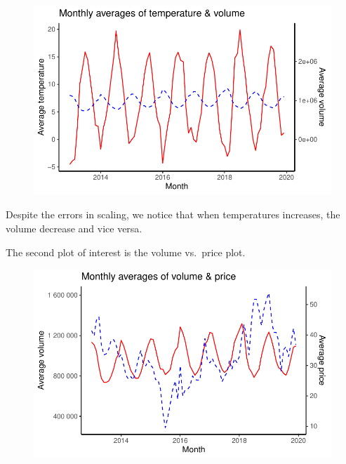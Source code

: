\documentclass[
  letterpaper,
  DIV=11,
  numbers=noendperiod]{scrartcl}
\newenvironment{Shaded}{\begin{snugshade}}{\end{snugshade}}
\newcommand{\NormalTok}[1]{\textcolor[rgb]{0.00,0.23,0.31}{#1}}
\newcommand{\SpecialCharTok}[1]{\textcolor[rgb]{0.37,0.37,0.37}{#1}}
\begin{document}
\begin{figure}[H]

{\centering \includegraphics{Assignment2_files/figure-pdf/unnamed-chunk-11-1.pdf}

}

\end{figure}

Despite the errors in scaling, we notice that when temperatures
increases, the volume decrease and vice versa.

The second plot of interest is the volume vs.~price plot.

\begin{Shaded}
\end{Shaded}

\begin{figure}[H]

{\centering \includegraphics{Assignment2_files/figure-pdf/unnamed-chunk-12-1.pdf}

}

\end{figure}
\end{document}
